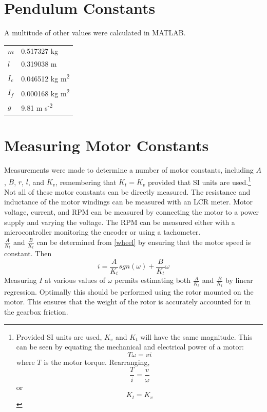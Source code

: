 \documentclass[12pt,letterpaper]{article}
\begin{document}
\begin{appendices}
\section{Pendulum Constants}
A multitude of other values were calculated in MATLAB.  \\

\begin{tabular}{l l}
$m$ & 0.517327 kg \\
$l$ & 0.319038 m \\
$I_{c}$ & 0.046512 kg m\textsuperscript{2} \\
$I_{f}$ & 0.000168 kg m\textsuperscript{2} \\
$g$ & 9.81 m s\textsuperscript{-2} \\
\end{tabular}




\section{Measuring Motor Constants}
\label{appendix:measure}
Measurements were made to determine a number of motor constants, including $A$, $B$, $r$, $l$, and $K_{v}$, remembering that $K_{t} = K_{v}$ provided that SI units are used.\footnote{Provided SI units are used, $K_{v}$ and $K_{t}$ will have the same magnitude.  This can be seen by equating the 
mechanical and electrical power of a motor:
\begin{equation*}
    T \omega = v i
\end{equation*}
where $T$ is the motor torque.
Rearranging,
\begin{equation*}
    \frac{T}{i} = \frac{v}{\omega}
\end{equation*}
or
\begin{equation*}
    K_{t} = K_{v} 
\end{equation*}
}
Not all of these motor constants can be directly measured.  The resistance and inductance of the motor windings can be measured with an LCR meter.
Motor voltage, current, and RPM can be measured by connecting the motor to a power supply and varying the voltage.  The RPM can be measured either with a microcontroller monitoring the encoder or using a tachometer.\\

$\frac{A}{K_{t}}$ and $\frac{B}{K_{t}}$ can be determined from \eqref{wheel} by ensuring that the motor speed is constant.  Then
\begin{equation}
    i = \frac{A}{K_{t}}sgn(\omega) + \frac{B}{K_{t}} \omega
\end{equation}
Measuring $I$ at various values of $\omega$ permits estimating both $\frac{A}{K_{t}}$ and $\frac{B}{K_{t}}$ by linear
regression.  Optimally this should be performed using the rotor mounted on the motor. This ensures that
the weight of the rotor is accurately accounted for in the gearbox friction.\\


\end{appendices}
\end{document}
